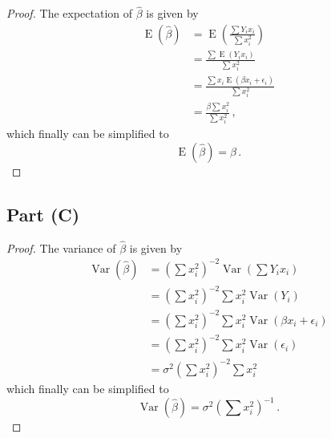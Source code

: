 \documentclass[
]{article}
\begin{document}
\begin{proof}
The expectation of $\hat\beta$ is given by
\begin{align*}
   \operatorname{E}(\hat\beta) &= \operatorname{E}\left(\frac{ \sum Y_i x_i }{\sum x_i^2}\right)\\
                      &= \frac{\sum \operatorname{E}(Y_i x_i)}{\sum x_i^2}\\
                      &= \frac{\sum x_i \operatorname{E}(\beta x_i + \epsilon_i)}{\sum x_i^2}\\
                      &= \frac{\beta \sum x^2_i}{\sum x_i^2}\,,
\end{align*}
which finally can be simplified to
\begin{equation}
   \operatorname{E}(\hat\beta) = \beta\,.
\end{equation}
\end{proof}

\hypertarget{part-c}{%
\subsection{Part (C)}\label{part-c}}


\begin{proof}
The variance of $\hat\beta$ is given by
\begin{align*}
   \operatorname{Var}(\hat\beta) &= \left(\sum x_i^2\right)^{-2}\operatorname{Var}\left(\sum Y_i x_i\right)\\
                   &= \left(\sum x_i^2\right)^{-2}\sum x_i^2 \operatorname{Var}(Y_i)\\
                   &= \left(\sum x_i^2\right)^{-2}\sum x_i^2 \operatorname{Var}(\beta x_i + \epsilon_i)\\
                   &= \left(\sum x_i^2\right)^{-2}\sum x_i^2 \operatorname{Var}(\epsilon_i)\\
                   &= \sigma^2 \left(\sum x_i^2\right)^{-2} \sum x_i^2
\end{align*}
which finally can be simplified to
\begin{equation}
   \operatorname{Var}(\hat\beta) = \sigma^2 \left(\sum x_i^2\right)^{-1}\,.
\end{equation}
\end{proof}
\end{document}
